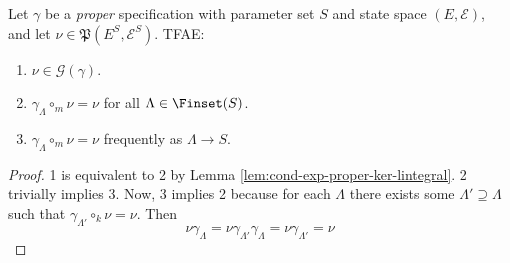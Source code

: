 \begin{lemma}
    \label{lem:gibbs-meas-tfae}
    \leanok

    Let $\gamma$ be a {\it proper} specification with parameter set $S$ and state space $(E, \mathcal{E})$, and let $\nu\in\mathfrak{P}(E^S, \mathcal{E}^S)$. TFAE:
    \begin{enumerate}
        \item $\nu\in\mathcal{G}(\gamma)$.
        \item $\gamma_\Lambda\circ_m\nu = \nu$ for all $\Lambda\in\Finset(S)$.
        \item $\gamma_\Lambda\circ_m\nu = \nu$ frequently as $\Lambda \to S$.
    \end{enumerate}
\end{lemma}
\begin{proof}
    \leanok

    1 is equivalent to 2 by Lemma \ref{lem:cond-exp-proper-ker-lintegral}. 2 trivially implies 3. Now, 3 implies 2 because for each $\Lambda$ there exists some $\Lambda' \supseteq \Lambda$ such that
    $\gamma_{\Lambda'}\circ_k\nu = \nu$. Then
    $$\nu\gamma_\Lambda = \nu\gamma_{\Lambda'}\gamma_\Lambda = \nu\gamma_{\Lambda'} = \nu$$
\end{proof}

